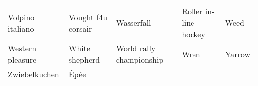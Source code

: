 \documentclass[10pt,journal,compsoc]{IEEEtran}
\begin{document}
\begin{table*}[!h]
\begin{tabular}{lllll}
Volpino italiano          & Vought f4u corsair              & Wasserfall                        & Roller in-line hockey                      & Weed                               \\
Western pleasure          & White shepherd                  & World rally championship          & Wren                                       & Yarrow                             \\
Zwiebelkuchen             & Épée                            &                                   &                                            &                                    \\
\bottomrule
\end{tabular}
\end{table*}
\end{document}
